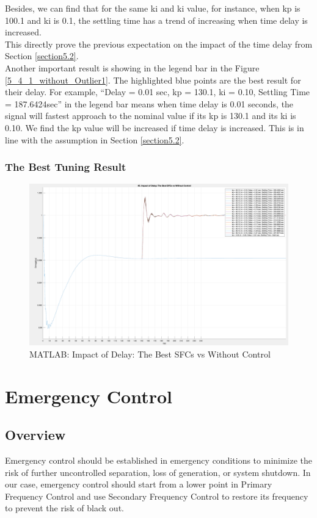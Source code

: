 \documentclass{report}
\begin{document}
Besides, we can find that for the same ki and ki value, for instance, when kp is 100.1 and ki is 0.1, the settling time has a trend of increasing when time delay is increased. \\

This directly prove the previous expectation on the impact of the time delay from Section \textcolor{red}{\ref{section5.2}}. \\


Another important result is showing in the legend bar in the Figure \textcolor{red}{\ref{5_4_1_without_Outlier1}}. The highlighted blue points are the best result for their delay. For example, “Delay = 0.01 sec, kp = 130.1, ki = 0.10, Settling Time = 187.6424sec” in the legend bar means when time delay is 0.01 seconds, the signal will fastest approach to the nominal value if its kp is 130.1 and its ki is 0.10. We find the kp value will be increased if time delay is increased. This is in line with the assumption in Section \textcolor{red}{\ref{section5.2}}.\\

\subsection{The Best Tuning Result} %
\begin{figure}[htbp]
\centering
\includegraphics[width = .819\textwidth]{figure/5_4_2.png}
\caption{MATLAB: Impact of Delay: The Best SFCs vs Without Control}
\label{5_4_2}
\end{figure}


\chapter{Emergency Control}
\label{Chapter6}
\section{Overview} %
Emergency  control should be established in emergency conditions to minimize the risk of further uncontrolled separation, loss of generation, or system shutdown. In our case, emergency control should start from a lower point in Primary Frequency Control and use Secondary Frequency Control to restore its frequency to prevent the risk of black out.\\
\end{document}
